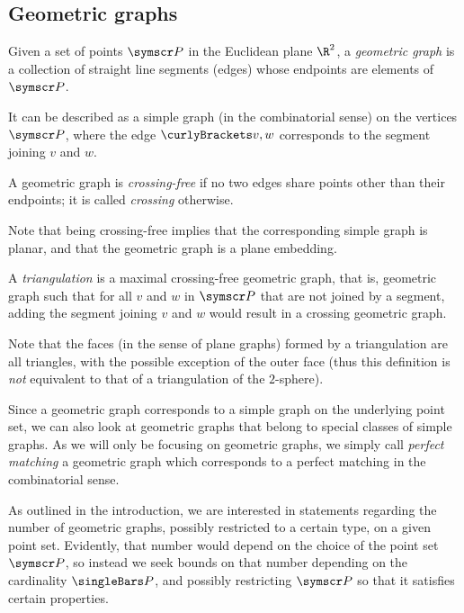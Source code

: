 \documentclass[10pt, a4paper, twoside]{basestyle}
\newcommand{\pointset}{\symscr}
\begin{document}
\subsection{Geometric graphs}
\begin{definition}
Given a set of points $\pointset P$ in the Euclidean plane $\R^2$,
a \emph{geometric graph} is a collection of straight line segments (edges)
whose endpoints are elements of $\pointset P$.

It can be described as a simple graph (in the combinatorial sense)
on the vertices $\pointset P$, where the edge $\set{v,w}$ corresponds to the segment joining
$v$ and $w$.
\end{definition}
\begin{definition}
A geometric graph is \emph{crossing-free} if no two edges share points other than
their endpoints; it is called \emph{crossing} otherwise.
\end{definition}
Note that being crossing-free implies that the corresponding simple graph is planar, and that the
geometric graph is a plane embedding.
\begin{sloppypar}
\begin{definition}[triangulation]
A \emph{triangulation} is a maximal crossing-free geometric graph, that is,
geometric graph such that for all $v$ and $w$ in $\pointset P$ that are not joined by a
segment, adding the segment joining $v$ and $w$ would result in a crossing
geometric graph.
\end{definition}
Note that the faces (in the sense of plane graphs) formed by a triangulation are
all triangles, with the possible exception of the outer face (thus this definition
is \emph{not} equivalent to that of a triangulation of the $2$-sphere).
\end{sloppypar}

Since a geometric graph corresponds to a simple graph on the underlying point set,
we can also look at geometric graphs that belong to special classes of simple graphs.
As we will only be focusing on geometric graphs, we simply call
\emph{perfect matching}
a geometric graph which corresponds to a perfect matching in the combinatorial sense.

As outlined in the introduction, we are interested in statements regarding the number
of geometric graphs, possibly restricted to a certain type, on a given point set.
Evidently, that number would depend on the choice of the point set $\pointset P$, so instead we seek
bounds on that number depending on the cardinality $\Cardinality P$, and possibly
restricting $\pointset P$ so that it satisfies certain properties.
\end{document}
